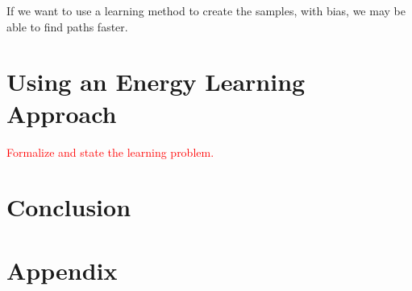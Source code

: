 \documentclass[11pt]{article}
\begin{document}
If we want to use a learning method to create the samples, with bias, we may be able to find paths faster. 


\section{Using an Energy Learning Approach}\label{sec:learning}

\textcolor{red}{Formalize and state the learning problem.}

\section{Conclusion}\label{sec:conclusion}



\newpage



\newpage
\appendix 

\section{Appendix}\label{sec:appendix}
\end{document}
